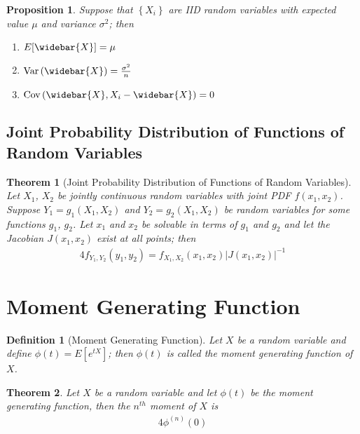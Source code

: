 \documentclass[11pt, oneside]{book}   	%
\newtheorem{definition}{Definition}[chapter]
\newtheorem{proposition}{Proposition}[chapter]
\newtheorem{theorem}{Theorem}[chapter]
\newcommand{\set}[1]{\left\{#1\right\}}
\newcommand{\var}[1]{\mathrm{Var}\left(#1\right)}
\newcommand{\cov}[1]{\mathrm{Cov}\left(#1\right)}
\begin{document}
\begin{proposition}
	Suppose that $\set{X_i}$ are IID random variables with expected value $\mu$ and variance $\sigma^2$; then 
	\begin{enumerate}
		\item $E[\widebar{X}] = \mu$ 
		\item $\var{\widebar{X}} = \frac{\sigma^2}{n}$
		\item $\cov{\widebar{X}, X_i-\widebar{X}} = 0$
	\end{enumerate}
\end{proposition}

\subsection{Joint Probability Distribution of Functions of Random Variables}

\begin{theorem}[Joint Probability Distribution of Functions of Random Variables]
	Let $X_1$, $X_2$ be jointly continuous random variables with joint PDF $f(x_1, x_2)$. Suppose $Y_1=g_1(X_1, X_2)$ and $Y_2=g_2(X_1, X_2)$ be random variables for some functions $g_1$, $g_2$. Let $x_1$ and $x_2$ be solvable in terms of $g_1$ and $g_2$ and let the Jacobian $J(x_1, x_2)$ exist at all points; then
	\begin{alignat}{4}
		f_{Y_1, Y_2}(y_1, y_2)=f_{X_1, X_2}(x_1, x_2)\left|J(x_1, x_2)\right|^{-1}
	\end{alignat}
\end{theorem}

\section{Moment Generating Function}

\begin{definition}[Moment Generating Function]
	Let $X$ be a random variable and define $\phi(t)=E\left[e^{tX}\right]$; then $\phi(t)$ is called the moment generating function of $X$. 
\end{definition}

\begin{theorem}
	Let $X$ be a random variable and let $\phi(t)$ be the moment generating function, then the $n^{th}$ moment of $X$ is 
	\begin{alignat}{4}
		\phi^{(n)}(0)
	\end{alignat}
\end{theorem}
\end{document}
